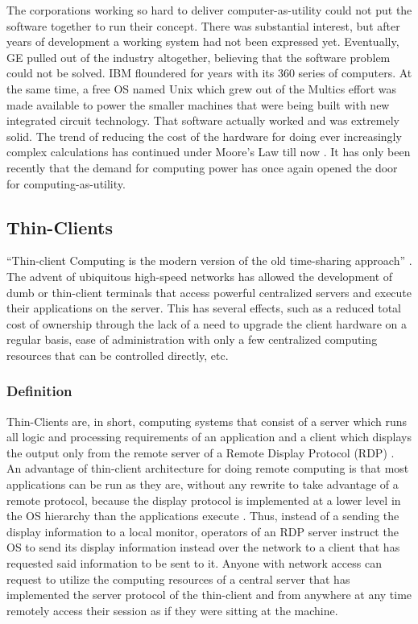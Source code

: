 \documentclass[12pt,oneside,letterpaper]{article}
\begin{document}
The corporations working so hard to deliver computer-as-utility could not put
the software together to run their concept.  There was substantial interest, but
after years of development a working system had not been expressed yet.
Eventually, GE pulled out of the industry altogether, believing that the
software problem could not be solved.  IBM floundered for years with its 360
series of computers.  At the same time, a free OS named Unix which grew out of
the Multics effort was made available to power the smaller machines that were
being built with new integrated circuit technology.  That software actually
worked and was extremely solid.  The trend of reducing the cost of the hardware
for doing ever increasingly complex calculations has continued under Moore's Law
till now \citep{kelly2004}.  It has only been recently that the demand for
computing power has once again opened the door for computing-as-utility.

\subsection{Thin-Clients}

``Thin-client Computing is the modern version of the old time-sharing approach''
\citep{schmidt1999}.  The advent of ubiquitous high-speed networks has allowed
the development of dumb or thin-client terminals that access powerful
centralized servers and execute their applications on the server.  This has
several effects, such as a reduced total cost of ownership through the lack of a
need to upgrade the client hardware on a regular basis, ease of administration
with only a few centralized computing resources that can be controlled directly,
etc.

\subsubsection{Definition}

Thin-Clients are, in short, computing systems that consist of a server which
runs all logic and processing requirements of an application and a client which
displays the output only from the remote server of a Remote Display Protocol
(RDP) \citep{lai2002}.  An advantage of thin-client architecture for doing remote
computing is that most applications can be run as they are, without any rewrite
to take advantage of a remote protocol, because the display protocol is
implemented at a lower level in the OS hierarchy than the applications execute
\citep{schmidt1999}.  Thus, instead of a sending the display information to a local
monitor, operators of an RDP server instruct the OS to send its display
information instead over the network to a client that has requested said
information to be sent to it.  Anyone with network access can request to utilize
the computing resources of a central server that has implemented the server
protocol of the thin-client and from anywhere at any time remotely access their
session as if they were sitting at the machine.
\end{document}
